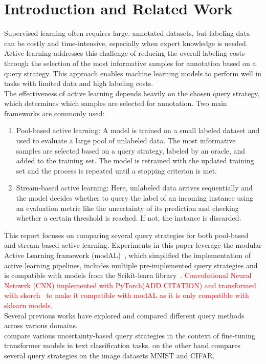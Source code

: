 \documentclass{article}
\theoremstyle{plain}
\theoremstyle{definition}
\theoremstyle{remark}
\begin{document}
\section{Introduction and Related Work}\label{sec:intro}
Supervised learning often requires large, annotated datasets, but labeling data can be costly and time-intensive, especially when expert knowledge is needed. 
Active learning addresses this challenge of reducing the overall labeling costs through the selection of the most informative samples for annotation based on a query strategy. This approach enables machine learning models to perform well in tasks with limited data and high labeling costs. \\
The effectiveness of active learning depends heavily on the chosen query strategy, which determines which samples are selected for annotation. Two main frameworks are commonly used:
\begin{enumerate}
	\item Pool-based active learning: A model is trained on a small labeled dataset and used to evaluate a large pool of unlabeled data. The most informative samples are selected based on a query strategy, labeled by an oracle, and added to the training set. The model is retrained with the updated training set and the process is repeated until a stopping criterion is met.
	\item Stream-based active learning: Here, unlabeled data arrives sequentially and the model decides whether to query the label of an incoming instance using an evaluation metric like the uncertainty of its prediction and checking whether a certain threshold is reached. If not, the instance is discarded.
\end{enumerate}
This report focuses on comparing several query strategies for both pool-based and stream-based active learning. Experiments in this paper leverage the modular Active Learning framework (modAL)~\cite{danka_modalmodularactivelearning}, which simplified the implementation of active learning pipelines, includes multiple pre-implemented query strategies and is compatible with models from the Scikit-learn library~\cite{scikit-learn}. \textcolor{red}{Convolutional Neural Netowrk (CNN) implemented with PyTorch(ADD CITATION) and transformed with skorch~\cite{skorch} to make it compatible with modAL as it is only compatible with sklearn models.} \\
Several previous works have explored and compared different query methods across various domains. \\
\cite{schröder_revisitinguncertaintybasedquerystrategies} compare various uncertainty-based query strategies in the context of fine-tuning transformer models in text classification tasks. \cite{zhan_comparativesurveydeepactive} on the other hand compares several query strategies on the image datasets MNIST and CIFAR. \\
\end{document}
